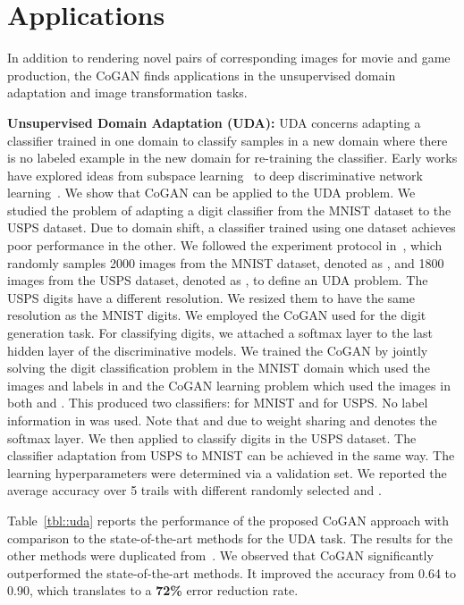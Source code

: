 \documentclass{article}
\begin{document}
\section{Applications}\label{sec::apps}

In addition to rendering novel pairs of corresponding images for movie and game production, the CoGAN finds applications in the unsupervised domain adaptation and image transformation tasks. 

{\bf Unsupervised Domain Adaptation (UDA):} UDA concerns adapting a classifier trained in one domain to classify samples in a new domain where there is no labeled example in the new domain for re-training the classifier. Early works have explored ideas from subspace learning~\cite{long2013transfer,fernando2015joint} to deep discriminative network learning~\cite{tzeng2014deep,rozantsev2016beyond,ganin2016domain}. We show that CoGAN can be applied to the UDA problem. We studied the problem of adapting a digit classifier from the MNIST dataset to the USPS dataset. Due to domain shift, a classifier trained using one dataset achieves poor performance in the other. We followed the experiment protocol in~\cite{long2013transfer,rozantsev2016beyond}, which randomly samples 2000 images from the MNIST dataset, denoted as , and 1800 images from the USPS dataset, denoted as , to define an UDA problem. The USPS digits have a different resolution. We resized them to have the same resolution as the MNIST digits. We employed the CoGAN used for the digit generation task. For classifying digits, we attached a softmax layer to the last hidden layer of the discriminative models. We trained the CoGAN by jointly solving the digit classification problem in the MNIST domain which used the images and labels in  and the CoGAN learning problem which used the images in both  and . This produced two classifiers:  for MNIST and  for USPS. No label information in  was used. Note that  and  due to weight sharing and  denotes the softmax layer. We then applied  to classify digits in the USPS dataset. The classifier adaptation from USPS to MNIST can be achieved in the same way. The learning hyperparameters were determined via a validation set. We reported the average accuracy over 5 trails with different randomly selected  and .

Table~\ref{tbl::uda} reports the performance of the proposed CoGAN approach with comparison to the state-of-the-art methods for the UDA task. The results for the other methods were duplicated from~\cite{rozantsev2016beyond}. We observed that CoGAN significantly outperformed the state-of-the-art methods. It improved the accuracy from 0.64 to 0.90, which translates to a {\bf 72\%} error reduction rate.
\end{document}

